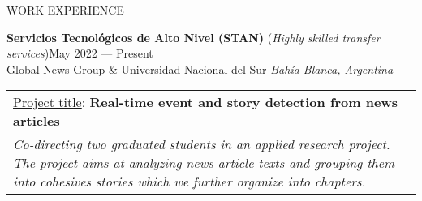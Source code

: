 \documentclass{resume} %
\begin{document}
\begin{rSection}{WORK EXPERIENCE}



\item  \textbf{Servicios Tecnológicos de Alto Nivel (STAN)} (\textit{Highly skilled transfer services})\hfill May 2022 --- Present\\\smallskip
Global News Group \& Universidad Nacional del Sur \hfill \textit{Bahía Blanca, Argentina}\\
\begin{table}[!ht]
\vspace{-0.7cm}
    \begin{tabular}{|p{\textwidth}}
    \underline{Project title}: \textbf{Real-time event and story detection from news articles} \\
\textit{Co-directing two graduated students in an applied research project. The project aims at analyzing news article texts and grouping them into cohesives stories which we further organize into chapters.}
    \end{tabular}\vspace{-0.7cm}
\end{table}


 
\bigskip


\end{rSection}
\end{document}
